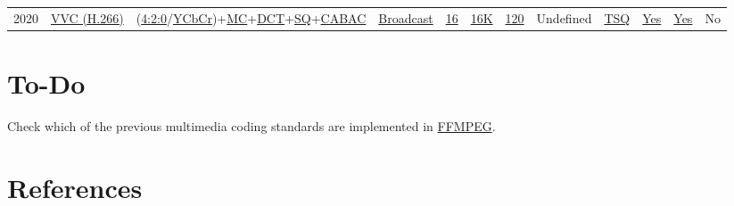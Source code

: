 \begin{tabular}{lrrrrrrrrrrr}
2020 & %
\href{https://en.wikipedia.org/wiki/Versatile_Video_Coding}{VVC (H.266)} & %
(\href{https://en.wikipedia.org/wiki/Chroma_subsampling#4:2:0}{4:2:0}/\href{https://en.wikipedia.org/wiki/JPEG#Color_space_transformation}{YCbCr})+\href{https://en.wikipedia.org/wiki/Motion_compensation}{MC}+\href{https://en.wikipedia.org/wiki/Discrete_cosine_transform}{DCT}+\href{https://en.wikipedia.org/wiki/Quantization_(signal_processing)}{SQ}+\href{https://en.wikipedia.org/wiki/Context-adaptive_variable-length_coding}{CABAC} & %
\href{https://en.wikipedia.org/wiki/Versatile_Video_Coding#Broadcast}{Broadcast} & %
\href{https://en.wikipedia.org/wiki/Versatile_Video_Coding#Concept}{16} & %
\href{https://en.wikipedia.org/wiki/16K_resolution}{16K} & %
\href{https://en.wikipedia.org/wiki/Versatile_Video_Coding#Concept}{120} & %
Undefined & %
\href{https://en.wikipedia.org/wiki/Versatile_Video_Coding#Concept}{TSQ} & %
\href{https://en.wikipedia.org/wiki/Versatile_Video_Coding#Concept}{Yes} & %
\href{https://en.wikipedia.org/wiki/Versatile_Video_Coding#Concept}{Yes} & %
No \\ %

\end{tabular}

\section{To-Do}

Check which of the previous multimedia coding standards are implemented in \href{https://ffmpeg.org/}{FFMPEG}.

\section{References}

\renewcommand{\addcontentsline}[3]{}%


